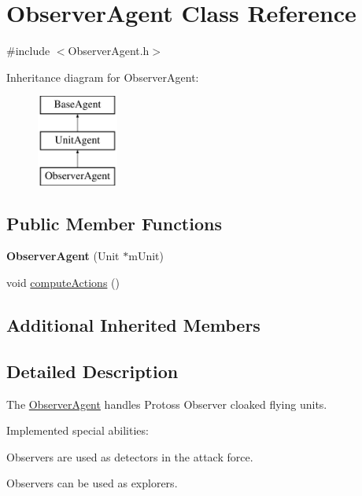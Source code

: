 \hypertarget{class_observer_agent}{\section{Observer\-Agent Class Reference}
\label{class_observer_agent}
}


{\ttfamily \#include $<$Observer\-Agent.\-h$>$}

Inheritance diagram for Observer\-Agent\-:\begin{figure}[H]
\begin{center}
\leavevmode
\includegraphics[height=3.000000cm]{class_observer_agent}
\end{center}
\end{figure}
\subsection*{Public Member Functions}
\begin{DoxyCompactItemize}
\item 
\hypertarget{class_observer_agent_a6edb413a670dcac62fa94e832dbdd3e9}{{\bfseries Observer\-Agent} (Unit $\ast$m\-Unit)}\label{class_observer_agent_a6edb413a670dcac62fa94e832dbdd3e9}

\item 
void \hyperlink{class_observer_agent_ad84822ff5d2fc4431dbb65ce5156ed5b}{compute\-Actions} ()
\end{DoxyCompactItemize}
\subsection*{Additional Inherited Members}


\subsection{Detailed Description}
The \hyperlink{class_observer_agent}{Observer\-Agent} handles Protoss Observer cloaked flying units.

Implemented special abilities\-:
\begin{DoxyItemize}
\item Observers are used as detectors in the attack force.
\item Observers can be used as explorers.
\end{DoxyItemize}

